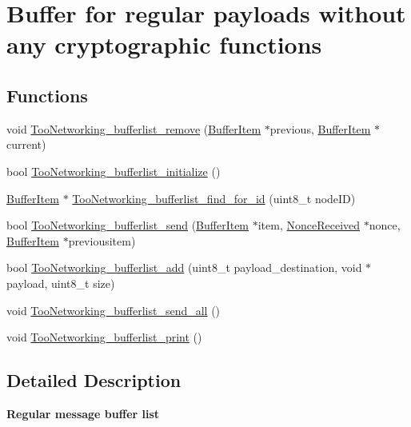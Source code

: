 \hypertarget{group__SIMPLE__BUFFER}{}\section{Buffer for regular payloads without any cryptographic functions}
\label{group__SIMPLE__BUFFER}
\subsection*{Functions}
\begin{DoxyCompactItemize}
\item 
void \hyperlink{group__SIMPLE__BUFFER_ga3c91b7ab2f6500c287ecc7ab4a018ef6}{Too\+Networking\+\_\+bufferlist\+\_\+remove} (\hyperlink{structBufferItem}{Buffer\+Item} $\ast$previous, \hyperlink{structBufferItem}{Buffer\+Item} $\ast$current)
\item 
bool \hyperlink{group__SIMPLE__BUFFER_gaa8a4e879d4d71fed2a8940cf93b75ae4}{Too\+Networking\+\_\+bufferlist\+\_\+initialize} ()
\item 
\hyperlink{structBufferItem}{Buffer\+Item} $\ast$ \hyperlink{group__SIMPLE__BUFFER_ga0dd5e9de81eea99b99669a607c9b4028}{Too\+Networking\+\_\+bufferlist\+\_\+find\+\_\+for\+\_\+id} (uint8\+\_\+t node\+ID)
\item 
bool \hyperlink{group__SIMPLE__BUFFER_gae72372a8084e8486f1306240a9af6474}{Too\+Networking\+\_\+bufferlist\+\_\+send} (\hyperlink{structBufferItem}{Buffer\+Item} $\ast$item, \hyperlink{structNonceReceived}{Nonce\+Received} $\ast$nonce, \hyperlink{structBufferItem}{Buffer\+Item} $\ast$previousitem)
\item 
bool \hyperlink{group__SIMPLE__BUFFER_ga1fca7e85a8a2f91a1b20a8bb23b4e893}{Too\+Networking\+\_\+bufferlist\+\_\+add} (uint8\+\_\+t payload\+\_\+destination, void $\ast$payload, uint8\+\_\+t size)
\item 
void \hyperlink{group__SIMPLE__BUFFER_gab58e06e0eb6f2f8ecbebeaf3c173fb22}{Too\+Networking\+\_\+bufferlist\+\_\+send\+\_\+all} ()
\item 
void \hyperlink{group__SIMPLE__BUFFER_ga2b5485b317146ce7c14bbad26172d796}{Too\+Networking\+\_\+bufferlist\+\_\+print} ()
\end{DoxyCompactItemize}


\subsection{Detailed Description}
{\bfseries Regular message buffer list} 

